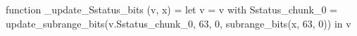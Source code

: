 function _update_Sstatus_bits (v, x) = let v = { v with Sstatus_chunk_0 = update_subrange_bits(v.Sstatus_chunk_0, 63, 0, subrange_bits(x, 63, 0)) } in
  v
